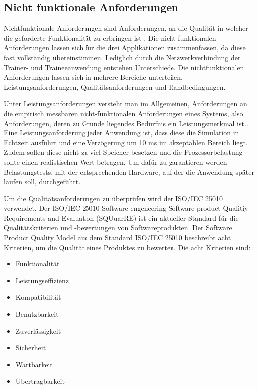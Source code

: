 \subsection{Nicht funktionale Anforderungen}

Nichtfunktionale Anforderungen sind Anforderungen, an die Qualität in welcher die geforderte Funktionalität zu erbringen ist \cite{funkAnf}. Die nicht funktionalen Anforderungen lassen sich für die drei Applikationen zusammenfassen, da diese fast vollständig übereinstimmen. Lediglich durch die Netzwerkverbindung der Trainer- und Traineeanwendung entstehen Unterschiede. Die nichtfunktionalen Anforderungen lassen sich in mehrere Bereiche unterteilen. Leistungsanforderungen, Qualitätsanforderungen und Randbedingungen.

Unter Leistungsanforderungen versteht man im Allgemeinen, Anforderungen an die empirisch messbaren nicht-funktionalen Anforderungen eines Systems, also
Anforderungen, deren zu Grunde liegendes Bedürfnis ein Leistungsmerkmal ist.\cite{nFunkAnf}. Eine Leistungsanforderung jeder Anwendung ist, dass diese die Simulation in Echtzeit ausführt und eine Verzögerung um 10 ms im akzeptablen Bereich liegt. Zudem sollen diese nicht zu viel Speicher besetzen und die Prozessorbelastung sollte einen realistischen Wert betragen. Um dafür zu garantieren werden Belastungstests, mit der entsprechenden Hardware, auf der die Anwendung später laufen soll, durchgeführt.

Um die Qualitätsanforderungen zu überprüfen wird der ISO/IEC 25010 verwendet. Der ISO/IEC 25010 \cite{iso25010}Software engeneering Software product Qualitiy Requirements and Evaluation (SQUuarRE) ist ein aktueller Standard für die Qualitätskriterien und -bewertungen von Softwareprodukten. Der Software Product Quality Model aus dem Standard ISO/IEC 25010 beschreibt acht Kriterien, um die Qualität eines Produktes zu bewerten. Die acht Kriterien sind:
\begin{itemize}
    \item Funktionalität
    \item Leistungseffizienz
    \item Kompatibilität
    \item Benutzbarkeit
    \item Zuverlässigkeit
    \item Sicherheit
    \item Wartbarkeit
    \item Übertragbarkeit
\end{itemize}

